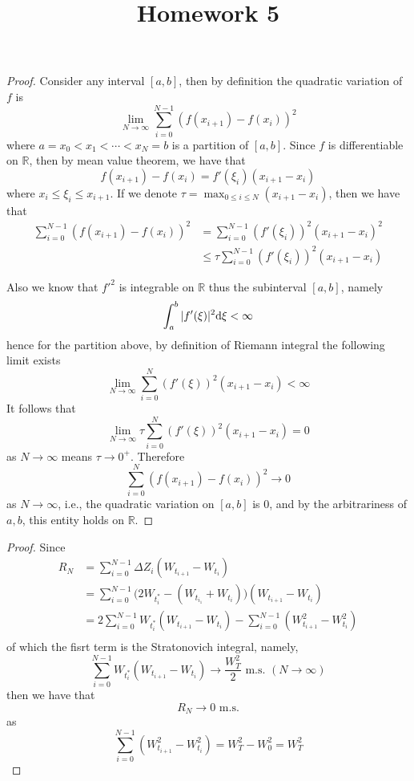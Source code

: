 \documentclass{homework}
\title{Homework 5}
\begin{document}
    \maketitle

    \problem
    \begin{proof}
        Consider any interval $[a,b]$, then by definition the
        quadratic variation of $f$ is
        \[\lim_{N\to\infty}\sum_{i=0}^{N-1} (f(x_{i+1})-f(x_i))^2\]
        where $a=x_0<x_1<\cdots<x_N=b$ is a partition of $[a,b]$.
        Since $f$ is differentiable on $\mathbb R$, then by mean
        value theorem, we have that
        \[f(x_{i+1})-f(x_i)=f'(\xi_i)(x_{i+1}-x_i)\]
        where $x_i\leq \xi_i\leq x_{i+1}$.
        If we denote $\tau=\max_{0\leq i\leq N}(x_{i+1}-x_i)$,
        then we have that
        \[\begin{aligned}
            \sum_{i=0}^{N-1}(f(x_{i+1})-f(x_i))^2
            &=\sum_{i=0}^{N-1}(f'(\xi_i))^2(x_{i+1}-x_i)^2\\
            &\leq\tau\sum_{i=0}^{N-1}(f'(\xi_i))^2(x_{i+1}-x_i)
        \end{aligned}\]

        Also we know that $f'^2$ is integrable on $\mathbb R$
        thus the subinterval $[a,b]$, namely
        \[\int_a^b|f'(\xi)|^2\mathrm d\xi<\infty\]
        hence for the partition above, by definition of Riemann
        integral the following limit exists
        \[\lim_{N\to\infty}\sum_{i=0}^N(f'(\xi))^2(x_{i+1}-x_i)
        <\infty\]
        It follows that
        \[\lim_{N\to\infty}\tau\sum_{i=0}^N(f'(\xi))^2(x_{i+1}-x_i)
        =0\]
        as $N\to\infty$ means $\tau\to 0^+$. Therefore
        \[\sum_{i=0}^N(f(x_{i+1})-f(x_i))^2\to 0\]
        as $N\to\infty$, i.e., the quadratic variation on $[a,b]$
        is 0, and by the arbitrariness of $a,b$, this entity holds
        on $\mathbb R$.
    \end{proof}

    \problem
    \begin{proof}
        Since
        \[\begin{aligned}
            R_N&=\sum_{i=0}^{N-1}\Delta Z_i(W_{t_{i+1}}-W_{t_i})\\
            &=\sum_{i=0}^{N-1}\big(2W_{t_i^*}-(W_{t_{i_1}}+W_{t_i})
              \big)(W_{t_{i+1}}-W_{t_i})\\ 
            &=2\sum_{i=0}^{N-1}W_{t^*_i}(W_{t_{i+1}}-W_{t_i})
              -\sum_{i=0}^{N-1}(W_{t_{i+1}}^2-W_{t_i}^2)\\
        \end{aligned}\]
        of which the fisrt term is the Stratonovich integral, namely,
        \[\sum_{i=0}^{N-1}W_{t_i^*}(W_{t_{i+1}}-W_{t_i})\to\frac{W_T^2}{2}
        \text{ m.s. }(N\to\infty)\]
        then we have that
        \[R_N\to 0\text{ m.s.}\]
        as
        \[\sum_{i=0}^{N-1}(W_{t_{i+1}}^2-W_{t_i}^2)=W_T^2-W_0^2=W_T^2\]
    \end{proof}
\end{document}
